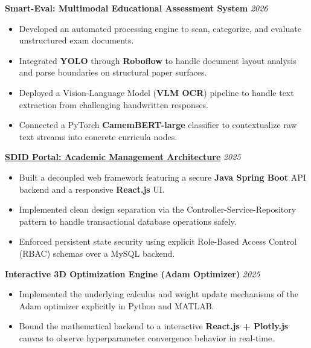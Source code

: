 \documentclass[11pt,a4paper]{article}
\begin{document}
\textbf{Smart-Eval: Multimodal Educational Assessment System} \hfill \textit{2026}
\begin{itemize}
    \item Developed an automated processing engine to scan, categorize, and evaluate unstructured exam documents.
    \item Integrated \textbf{YOLO} through \textbf{Roboflow} to handle document layout analysis and parse boundaries on structural paper surfaces.
    \item Deployed a Vision-Language Model (\textbf{VLM OCR}) pipeline to handle text extraction from challenging handwritten responses.
    \item Connected a PyTorch \textbf{CamemBERT-large} classifier to contextualize raw text streams into concrete curricula nodes.
\end{itemize}

\vspace{4pt}

\textbf{\href{https://github.com/rayanakioud7/SDID-portal-fullstack}{SDID Portal: Academic Management Architecture}} \hfill \textit{2025}
\begin{itemize}
    \item Built a decoupled web framework featuring a secure \textbf{Java Spring Boot} API backend and a responsive \textbf{React.js} UI.
    \item Implemented clean design separation via the Controller-Service-Repository pattern to handle transactional database operations safely.
    \item Enforced persistent state security using explicit Role-Based Access Control (RBAC) schemas over a MySQL backend.
\end{itemize}

\vspace{4pt}

\textbf{Interactive 3D Optimization Engine (Adam Optimizer)} \hfill \textit{2025}
\begin{itemize}
    \item Implemented the underlying calculus and weight update mechanisms of the Adam optimizer explicitly in Python and MATLAB.
    \item Bound the mathematical backend to a interactive \textbf{React.js + Plotly.js} canvas to observe hyperparameter convergence behavior in real-time.
\end{itemize}
\end{document}
